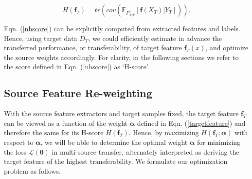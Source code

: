 \documentclass[letterpaper]{article} %
\begin{document}
\begin{equation}
    H(\boldsymbol{f}_T) = tr(cov(\mathbb{E}_{P_{X|Y}^T}[\boldsymbol{f}(X_T)|Y_T])).
    \label{nhscore}
\end{equation}

 Eqn. (\ref{nhscore}) can be explicitly computed from extracted features and labels. Hence, using target data $D_T$, we could efficiently estimate in advance the transferred performance, or transferability, of target feature $\boldsymbol{f}_T(x)$, and optimize the source weights accordingly.
For clarity, in the following sections we refer to the score defined in Eqn. (\ref{nhscore}) as `H-score'.





\subsection{Source Feature Re-weighting}

With the source feature extractors and target samples fixed, the target feature $\boldsymbol{f}_T$ can be viewed as a function of the weight $\boldsymbol{\alpha}$ defined in Eqn. (\ref{targetfeature}) and therefore the same for its H-score $H(\boldsymbol{f}_T)$. Hence, by maximizing $H(\boldsymbol{f}_T; \boldsymbol{\alpha})$ with respect to $\boldsymbol{\alpha}$, we will be able to determine the optimal weight $\boldsymbol{\alpha}$ for minimizing the loss $\mathcal L(\boldsymbol{\theta})$ in multi-source transfer, alternately interpreted as deriving the target feature of the highest transferability. We formulate our optimization problem as follows.
\end{document}
